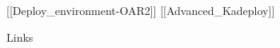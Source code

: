 \documentclass[final]{beamer}
\newlength{\threecolwid}
\begin{document}
\begin{frame}[t]
\begin{columns}[t]
\begin{column}{\threecolwid}
\begin{alertblock}{[[Deploy\_environment-OAR2]] [[Advanced\_Kadeploy]]}

\end{alertblock}



\begin{alertblock}{Links}

\end{alertblock}


\end{column} %

\end{columns} %

\end{frame} %
\end{document}

